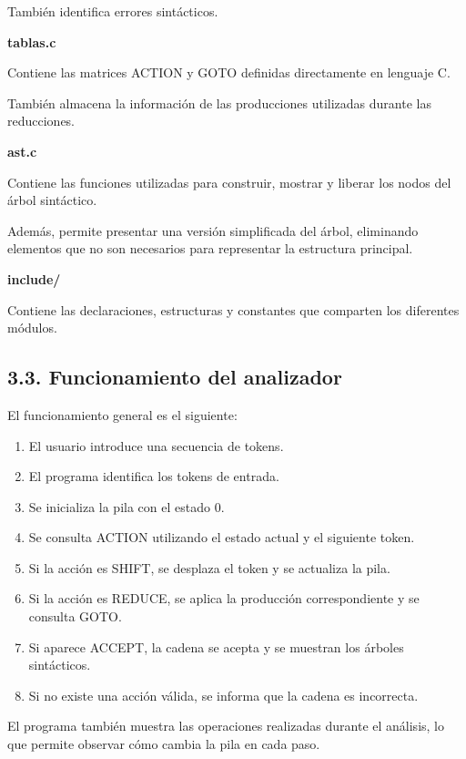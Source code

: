 \documentclass[11pt,letterpaper]{article}
\begin{document}
También identifica errores sintácticos.

\textbf{tablas.c}

Contiene las matrices ACTION y GOTO
definidas directamente en lenguaje C.

También almacena la información de las
producciones utilizadas durante las reducciones.

\textbf{ast.c}

Contiene las funciones utilizadas para construir,
mostrar y liberar los nodos del árbol sintáctico.

Además, permite presentar una versión simplificada
del árbol, eliminando elementos que no son necesarios
para representar la estructura principal.

\textbf{include/}

Contiene las declaraciones, estructuras y
constantes que comparten los diferentes módulos.

\subsection*{3.3. Funcionamiento del analizador}

El funcionamiento general es el siguiente:

\begin{enumerate}
    \item El usuario introduce una secuencia de tokens.
    \item El programa identifica los tokens de entrada.
    \item Se inicializa la pila con el estado 0.
    \item Se consulta ACTION utilizando el estado actual
          y el siguiente token.
    \item Si la acción es SHIFT, se desplaza el token
          y se actualiza la pila.
    \item Si la acción es REDUCE, se aplica la producción
          correspondiente y se consulta GOTO.
    \item Si aparece ACCEPT, la cadena se acepta
          y se muestran los árboles sintácticos.
    \item Si no existe una acción válida,
          se informa que la cadena es incorrecta.
\end{enumerate}

El programa también muestra las operaciones
realizadas durante el análisis, lo que permite
observar cómo cambia la pila en cada paso.

\end{document}
